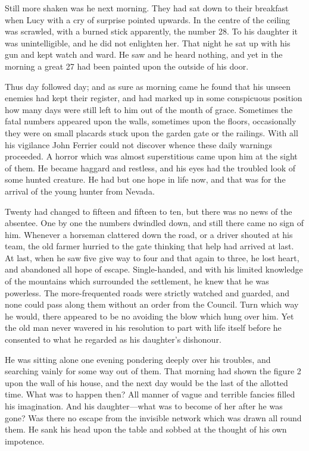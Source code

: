 \documentclass[12pt]{book}
\begin{document}
Still more shaken was he next morning. They had sat down to their breakfast when Lucy with a cry of surprise pointed upwards. In the centre of the ceiling was scrawled, with a burned stick apparently, the number 28. To his daughter it was unintelligible, and he did not enlighten her. That night he sat up with his gun and kept watch and ward. He saw and he heard nothing, and yet in the morning a great 27 had been painted upon the outside of his door. 

Thus day followed day; and as sure as morning came he found that his unseen enemies had kept their register, and had marked up in some conspicuous position how many days were still left to him out of the month of grace. Sometimes the fatal numbers appeared upon the walls, sometimes upon the floors, occasionally they were on small placards stuck upon the garden gate or the railings. With all his vigilance John Ferrier could not discover whence these daily warnings proceeded. A horror which was almost superstitious came upon him at the sight of them. He became haggard and restless, and his eyes had the troubled look of some hunted creature. He had but one hope in life now, and that was for the arrival of the young hunter from Nevada. 

Twenty had changed to fifteen and fifteen to ten, but there was no news of the absentee. One by one the numbers dwindled down, and still there came no sign of him. Whenever a horseman clattered down the road, or a driver shouted at his team, the old farmer hurried to the gate thinking that help had arrived at last. At last, when he saw five give way to four and that again to three, he lost heart, and abandoned all hope of escape. Single-handed, and with his limited knowledge of the mountains which surrounded the settlement, he knew that he was powerless. The more-frequented roads were strictly watched and guarded, and none could pass along them without an order from the Council. Turn which way he would, there appeared to be no avoiding the blow which hung over him. Yet the old man never wavered in his resolution to part with life itself before he consented to what he regarded as his daughter’s dishonour. 

He was sitting alone one evening pondering deeply over his troubles, and searching vainly for some way out of them. That morning had shown the figure 2 upon the wall of his house, and the next day would be the last of the allotted time. What was to happen then? All manner of vague and terrible fancies filled his imagination. And his daughter—what was to become of her after he was gone? Was there no escape from the invisible network which was drawn all round them. He sank his head upon the table and sobbed at the thought of his own impotence. 
\end{document}
